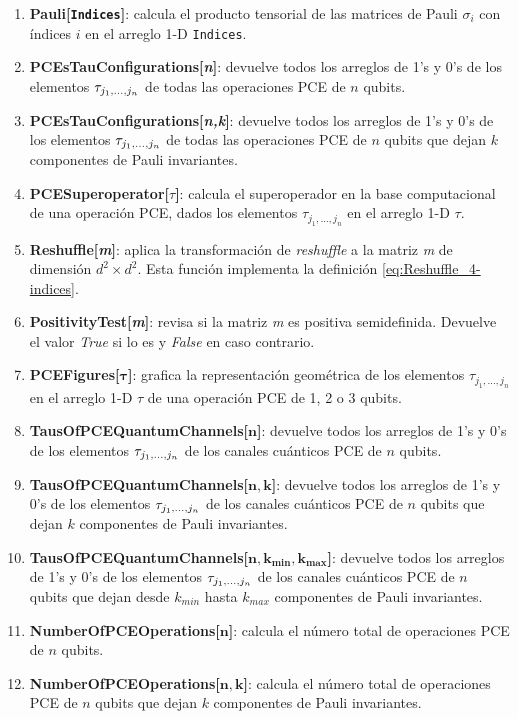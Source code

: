 \begin{enumerate}
	\item \textbf{Pauli[\texttt{Indices}]}: calcula el producto tensorial 
	de las matrices 	de Pauli $\sigma_i$ con índices $i$ en el 
	arreglo 1-D \texttt{Indices}.
	\item \textbf{PCEsTauConfigurations[\textit{n}]}: devuelve todos
	los arreglos de 1's y 0's de los elementos $\tau_{j_1,\ldots ,j_n}$
	de todas las operaciones PCE de $n$ qubits.
	\item \textbf{PCEsTauConfigurations[\textit{n,k}]}: devuelve todos 
	los arreglos de 1's y 0's de los elementos $\tau_{j_1,\ldots ,j_n}$
	de todas las operaciones PCE de $n$ qubits que dejan $k$ 
	componentes de Pauli invariantes.
	\item \textbf{PCESuperoperator[$\tau$]}: calcula el superoperador en 
	la base computacional de una operación PCE, dados los elementos
	$\tau_{j_1,\ldots,j_n}$	en el arreglo 1-D $\tau$.	
	\item \textbf{Reshuffle[\textit{m}]}: aplica la transformación de 
	\textit{reshuffle} a la matriz \textit{m} de dimensión $d^2\times d^2$.
	Esta función implementa la definición \eqref{eq:Reshuffle_4-indices}.
	\item \textbf{PositivityTest[\textit{m}]}: revisa si la matriz \textit{m}
	es positiva semidefinida. Devuelve el valor \textit{True} si lo es y 
	\textit{False} en caso contrario. 
	\item \textbf{PCEFigures[$\boldsymbol{\tau}$]}: grafica la representación 
	geométrica de los elementos $\tau_{j_1,\ldots,j_n}$ en el arreglo 
	1-D $\tau$ de una operación PCE de 1, 2 o 3 qubits. 
	\item \textbf{TausOfPCEQuantumChannels[$\boldsymbol{n}$]}: 
	devuelve todos los arreglos de 1's y 0's de los elementos 
	$\tau_{j_1,\ldots ,j_n}$ de los canales 	cuánticos PCE de $n$ qubits.
	\item \textbf{TausOfPCEQuantumChannels[$\boldsymbol{n,k}$]}: 
	devuelve todos los arreglos de 1's y 0's de los elementos 
	$\tau_{j_1,\ldots ,j_n}$ de los canales cuánticos PCE de $n$ qubits que dejan $k$
	componentes de Pauli invariantes.
	\item \textbf{TausOfPCEQuantumChannels[$\boldsymbol{n,k_{min},
	k_{max}}$]}: 
	devuelve todos los arreglos de 1's y 0's de los elementos 
	$\tau_{j_1,\ldots ,j_n}$ de los canales cuánticos PCE de $n$ qubits que dejan desde 
	$k_{min}$ hasta $k_{max}$	componentes de Pauli invariantes.
	\item \textbf{NumberOfPCEOperations[$\boldsymbol{n}$]}: calcula 
	el número total de operaciones PCE de $n$ qubits. 
	\item \textbf{NumberOfPCEOperations[$\boldsymbol{n,k}$]}: calcula 
	el número total de operaciones PCE de $n$ qubits que dejan $k$
	componentes de Pauli invariantes. 	
\end{enumerate}

